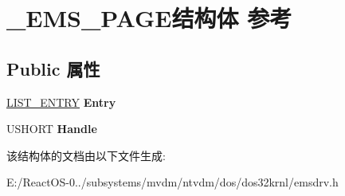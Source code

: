 \hypertarget{struct___e_m_s___p_a_g_e}{}\section{\+\_\+\+E\+M\+S\+\_\+\+P\+A\+G\+E结构体 参考}
\label{struct___e_m_s___p_a_g_e}
\subsection*{Public 属性}
\begin{DoxyCompactItemize}
\item 
\mbox{\label{struct___e_m_s___p_a_g_e_afb07651acc6ea0f58c947e754c9e5f61}} 
\hyperlink{struct___l_i_s_t___e_n_t_r_y}{L\+I\+S\+T\+\_\+\+E\+N\+T\+RY} {\bfseries Entry}
\item 
\mbox{\label{struct___e_m_s___p_a_g_e_a353560b2a93f4e6f1be61aec8b88ab45}} 
U\+S\+H\+O\+RT {\bfseries Handle}
\end{DoxyCompactItemize}


该结构体的文档由以下文件生成\+:\begin{DoxyCompactItemize}
\item 
E\+:/\+React\+O\+S-\/0../subsystems/mvdm/ntvdm/dos/dos32krnl/emsdrv.\+h\end{DoxyCompactItemize}

